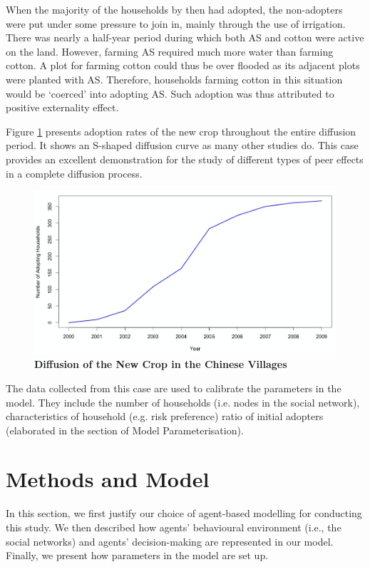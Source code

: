 \documentclass{bmcart}
\renewcommand{\figurename}{Figure }
\begin{document}
When the majority of the households by then had adopted, the non-adopters were put under some pressure to join in, mainly through the use of irrigation. There was nearly a half-year period during which both AS and cotton were active on the land. However, farming AS required much more water than farming cotton. A plot for farming cotton could thus be over flooded as its adjacent plots were planted with AS. Therefore, households farming cotton in this situation would be `coerced' into adopting AS. Such adoption was thus attributed to positive externality effect. 

\figurename \ref{Fig: diffusion curve AS} presents adoption rates of the new crop throughout the entire diffusion period. It shows an S-shaped diffusion curve as many other studies do. This case provides an excellent demonstration for the study of different types of peer effects in a complete diffusion process.

\begin{center}
\begin{figure}[ht!]
\centering
\includegraphics[scale=0.35]{Diffusion_curve_AS.jpg}
\caption{\textbf{Diffusion of the New Crop in the Chinese Villages}}
\label{Fig: diffusion curve AS}
\end{figure}
\end{center}

The data collected from this case are used to calibrate the parameters in the model. They include the number of households (i.e. nodes in the social network), characteristics of household (e.g. risk preference) ratio of initial adopters (elaborated in the section of Model Parameterisation).  

\section*{Methods and Model}
In this section, we first justify our choice of agent-based modelling for conducting this study. We then described how agents' behavioural environment (i.e., the social networks) and agents' decision-making are represented in our model. Finally, we present how parameters in the model are set up.
\end{document}
